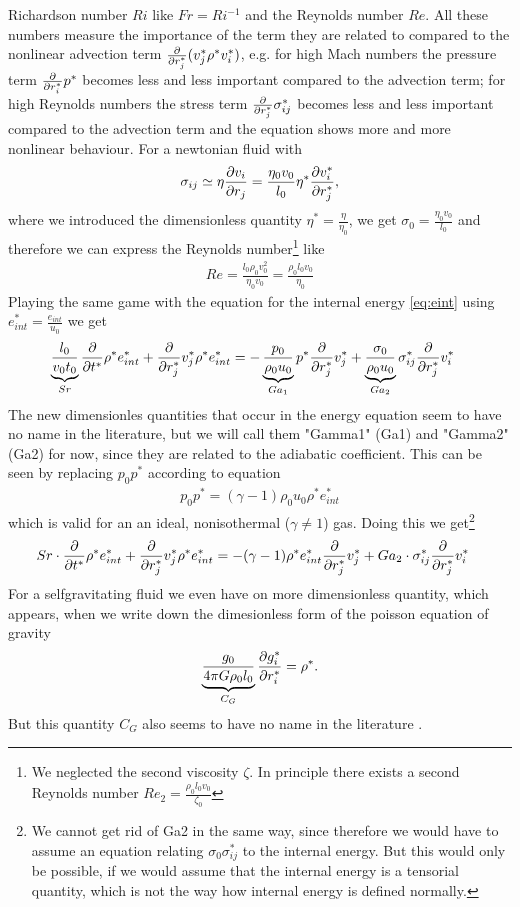 Richardson number $Ri$ like $Fr=Ri^{-1}$ and the Reynolds number $Re$.
All these numbers measure the importance of the term they are related to
compared to the nonlinear advection term $\pd{r_j^*}(v_j^* \rho^* v_i^*)$,
e.g. for high Mach numbers the pressure term $\pd{r_i^*}p^*$ becomes less and
less important compared to the advection term; for high Reynolds numbers the 
stress term $\pd{r_j^*}\sigma_{ij}^*$ becomes less and less important compared
to the advection term and the equation shows more and more nonlinear behaviour.
For a newtonian fluid with
\begin{align}
\sigma_{ij} \simeq \eta \ppd{r_j}{v_i} = 
\frac{\eta_0 v_0}{l_0} \eta^* \ppd{r_j^*}{v_i^*},
\end{align}
where we introduced the dimensionless quantity $\eta^*=\frac{\eta}{\eta_0}$,
we get $\sigma_0= \frac{\eta_0 v_0}{l_0}$ and therefore we can express the
Reynolds number\footnote{We neglected the second viscosity $\zeta$. In 
principle there exists a second Reynolds number $Re_2=\frac{\rho_0 l_0 v_0
}{\zeta_0}$} like
\begin{align}
Re=\frac{l_0 \rho_0 v_0^2 }{\eta_0 v_0} = \frac{\rho_0 l_0 v_0 }{\eta_0}
\end{align}
Playing the same game with the equation for the internal energy \ref{eq:eint}
using $e_{int}^*=\frac{e_{int}}{u_0}$ we get
\begin{align*}
\underbrace{\frac{l_0}{v_0 t_0}}_{Sr} \pd{t^*}\rho^* e_{int}^* 
+ \pd{r_j^*} v_j^* \rho^* e_{int}^* &= 
-\underbrace{\frac{p_0}{\rho_0 u_0}}_{Ga_1} p^*\pd{r_j^*}v_j^*
+\underbrace{\frac{\sigma_0}{\rho_0 u_0}}_{Ga_2} \sigma_{ij}^* \pd{r_j^*}v_i^*
\end{align*}
The new dimensionles quantities that occur in the energy equation seem to have
no name in the literature, but we will call them "Gamma1" (Ga1) and "Gamma2"
(Ga2) for now, since they are related to the adiabatic coefficient.
This can be seen by replacing $p_0 p^*$ according to equation
\begin{align}
p_0 p^* = (\gamma-1) \rho_0 u_0 \rho^* e_{int}^*
\end{align}
which is valid for an an ideal, nonisothermal ($\gamma \neq 1$) gas. Doing this
we get\footnote{We cannot get rid of Ga2 in the same way, since therefore we
would have to assume an equation relating $\sigma_0 \sigma_{ij}^*$ to the
internal energy. But this would only be possible, if we would assume that the
internal energy is a tensorial quantity, which is not the way how
internal energy is defined normally.}
\begin{align*}
 Sr \cdot \pd{t^*}\rho^* e_{int}^* 
+ \pd{r_j^*} v_j^* \rho^* e_{int}^* &= 
-(\gamma-1) \rho^* e_{int}^* \pd{r_j^*}v_j^*
+Ga_2 \cdot \sigma_{ij}^* \pd{r_j^*}v_i^*
\end{align*}
For a selfgravitating fluid we even have on more dimensionless quantity, which
appears, when we write down the dimesionless form of the poisson equation of
gravity
\begin{align}
\underbrace{\frac{g_0}{4\pi G \rho_0 l_0}}_{C_G}\ppd{r_i^*}{g_i^*} = \rho^*.
\end{align}
But this quantity $C_G$ also seems to have no name in the literature
\citep[e.g.][]{Durst2007}.

